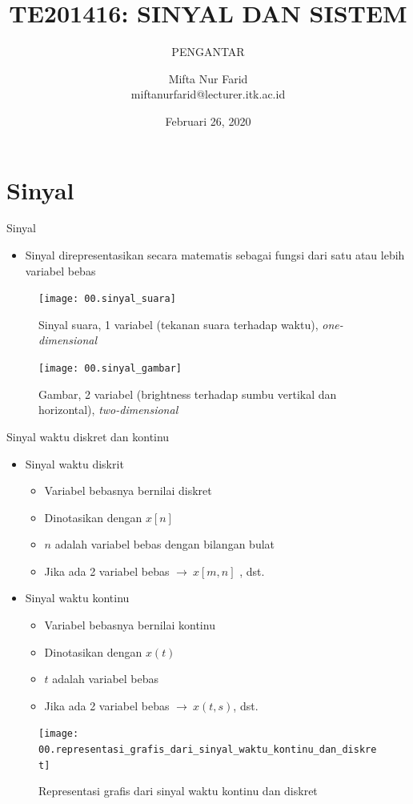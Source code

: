 \documentclass[aspectratio=169]{beamer}
\author{Mifta Nur Farid \\
	miftanurfarid@lecturer.itk.ac.id}
\title{TE201416: SINYAL DAN SISTEM}
\subtitle{PENGANTAR}
\institute{Teknik Elektro \\ Institut Teknologi Kalimantan \\ Balikpapan, Indonesia}
\date{\tiny Februari 26, 2020}
\begin{document}
\begin{frame}[t,plain]
\titlepage
\end{frame}

\section{Sinyal}

\begin{frame}{Sinyal}
	\begin{itemize}
		\item Sinyal direpresentasikan secara matematis sebagai fungsi dari satu atau lebih variabel bebas
	\end{itemize}
	\begin{multicols}{2}
		\begin{figure}
			\texttt{[image: 00.sinyal\_suara]}
			\caption{Sinyal suara, 1 variabel (tekanan suara terhadap waktu), \textit{one-dimensional}}
		\end{figure}
		\begin{figure}
			\texttt{[image: 00.sinyal\_gambar]}
			\caption{Gambar, 2 variabel (brightness terhadap sumbu vertikal dan horizontal), \textit{two-dimensional}}
		\end{figure}
	\end{multicols}
\end{frame}

\begin{frame}{Sinyal waktu diskret dan kontinu}
	\begin{multicols}{2}
		\begin{itemize}
			\item Sinyal waktu diskrit
			\begin{itemize}
				\item Variabel bebasnya bernilai diskret
				\item Dinotasikan dengan $ x[n] $
				\item $ n $ adalah variabel bebas dengan bilangan bulat
				\item Jika ada 2 variabel bebas $ \rightarrow ~ x[m,n] $ , dst.
			\end{itemize}
			\item Sinyal waktu kontinu
			\begin{itemize}
				\item Variabel bebasnya bernilai kontinu
				\item Dinotasikan dengan $ x(t) $
				\item $ t $ adalah variabel bebas
				\item Jika ada 2 variabel bebas $ \rightarrow ~ x(t,s) $, dst.
			\end{itemize}
		\end{itemize}
		\vfill\null
		\columnbreak
		\begin{figure}
			\centering
			\texttt{[image: 00.representasi\_grafis\_dari\_sinyal\_waktu\_kontinu\_dan\_diskret]}
			\caption{Representasi grafis dari sinyal waktu kontinu dan diskret}
		\end{figure}
	\end{multicols}
\end{frame}
\end{document}
